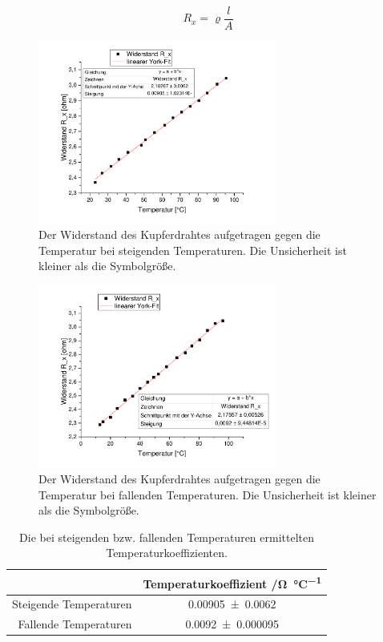 \documentclass[
	a4paper,
	12pt,
	pagesize,
	ngerman
]{scrartcl}
\begin{document}
	\begin{equation}
	R_x =\varrho \frac{l}{A}
	\label{prop}
	\end{equation}
	\begin{figure}[H]
		\includegraphics[width=0.7\textwidth]{Temp_Steig}
		\centering
		\caption{Der Widerstand des Kupferdrahtes aufgetragen gegen die Temperatur bei steigenden Temperaturen. Die Unsicherheit ist kleiner als die Symbolgröße.}
		\label{Temp_Steig}
		\centering
	\end{figure}
	\begin{figure}[H]
		\includegraphics[width=0.7\textwidth]{Temp_Fall}
		\centering
		\caption{Der Widerstand des Kupferdrahtes aufgetragen gegen die Temperatur bei fallenden Temperaturen. Die Unsicherheit ist kleiner als die Symbolgröße.}
		\label{Temp_Fall}
		\centering
	\end{figure}
	\begin{table}[H]
		\centering
		\begin{tabular}{ r | c }
			&Temperaturkoeffizient /\si{\ohm \per \celsius}\\ \hline
			Steigende Temperaturen& \SI{0,00905\pm 0,0062}{}\\
			Fallende Temperaturen & \SI{0,0092\pm 0,000095}{}\\
		\end{tabular}
		\caption{Die bei steigenden bzw. fallenden Temperaturen ermittelten Temperaturkoeffizienten.}
		\label{Koeff} 
	\end{table}
\end{document}
